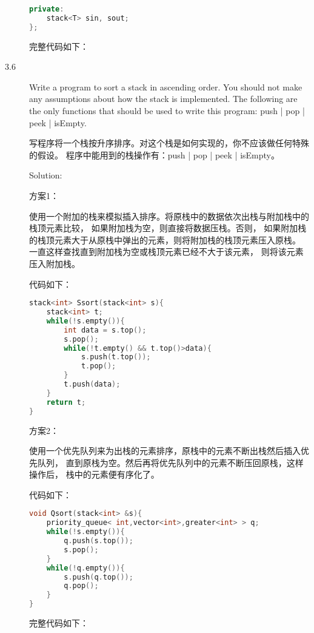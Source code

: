 \begin{description}
\begin{lstlisting}[language=C++]
private:
    stack<T> sin, sout;    
};
\end{lstlisting}

完整代码如下：



\item[3.6] Write a program to sort a stack in ascending order. You should not make any assumptions about how the stack is implemented. The following are the only functions that should be used to write this program: push | pop | peek | isEmpty.

写程序将一个栈按升序排序。对这个栈是如何实现的，你不应该做任何特殊的假设。 程序中能用到的栈操作有：push | pop | peek | isEmpty。

Solution: 

方案1：

使用一个附加的栈来模拟插入排序。将原栈中的数据依次出栈与附加栈中的栈顶元素比较， 如果附加栈为空，则直接将数据压栈。否则， 如果附加栈的栈顶元素大于从原栈中弹出的元素，则将附加栈的栈顶元素压入原栈。 一直这样查找直到附加栈为空或栈顶元素已经不大于该元素， 则将该元素压入附加栈。

代码如下：

\begin{lstlisting}[language=C++]
stack<int> Ssort(stack<int> s){
    stack<int> t;
    while(!s.empty()){
        int data = s.top();
        s.pop();
        while(!t.empty() && t.top()>data){
            s.push(t.top());
            t.pop();
        }
        t.push(data);
    }
    return t;
}
\end{lstlisting}

方案2：

使用一个优先队列来为出栈的元素排序，原栈中的元素不断出栈然后插入优先队列， 直到原栈为空。然后再将优先队列中的元素不断压回原栈，这样操作后， 栈中的元素便有序化了。

代码如下：

\begin{lstlisting}[language=C++]
void Qsort(stack<int> &s){
    priority_queue< int,vector<int>,greater<int> > q;
    while(!s.empty()){
        q.push(s.top());
        s.pop();
    }
    while(!q.empty()){
        s.push(q.top());
        q.pop();
    }
}
\end{lstlisting}

完整代码如下：


\end{description}
